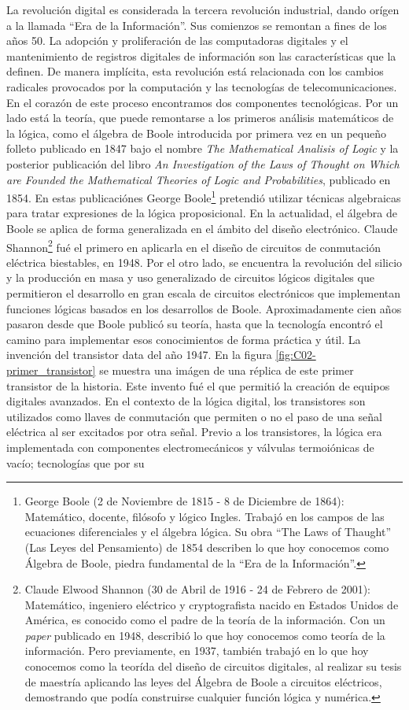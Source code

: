 La revolución digital es considerada la tercera revolución industrial, dando orígen a la llamada ``Era de la Información''. Sus comienzos se remontan a fines de los años 50. La adopción y proliferación de las computadoras digitales y el mantenimiento de registros digitales de información son las características que la definen. De manera implícita, esta revolución está relacionada con los cambios radicales provocados por la computación y las tecnologías de telecomunicaciones. En el corazón de este proceso encontramos dos componentes tecnológicas. Por un lado está la teoría, que puede remontarse a los primeros análisis matemáticos de la lógica, como el álgebra de Boole introducida por primera vez en un pequeño folleto publicado en 1847 bajo el nombre \emph{The Mathematical Analisis of Logic} y la posterior publicación del libro \emph{An Investigation of the Laws of Thought on Which are Founded the Mathematical Theories of Logic and Probabilities}, publicado en 1854. En estas publicaciónes George Boole\footnote{George Boole (2 de Noviembre de 1815 - 8 de Diciembre de 1864): Matemático, docente, filósofo y lógico Ingles. Trabajó en los campos de las ecuaciones diferenciales y el álgebra lógica. Su obra ``The Laws of Thaught'' (Las Leyes del Pensamiento) de 1854 describen lo que hoy conocemos como Álgebra de Boole, piedra fundamental de la ``Era de la Información''.} pretendió utilizar técnicas algebraicas para tratar expresiones de la lógica proposicional. En la actualidad, el álgebra de Boole se aplica de forma generalizada en el ámbito del diseño electrónico. Claude Shannon\footnote{Claude Elwood Shannon (30 de Abril de 1916 - 24 de Febrero de 2001): Matemático, ingeniero eléctrico y cryptografista nacido en Estados Unidos de América, es conocido como el padre de la teoría de la información. Con un \emph{paper} publicado en 1948, describió lo que hoy conocemos como teoría de la información. Pero previamente, en 1937, también trabajó en lo que hoy conocemos como la teorída del diseño de circuitos digitales, al realizar su tesis de maestría aplicando las leyes del Álgebra de Boole a circuitos eléctricos, demostrando que podía construirse cualquier función lógica y numérica.} fué el primero en aplicarla en el diseño de circuitos de conmutación eléctrica biestables, en 1948. Por el otro lado, se encuentra la revolución del silicio y la producción en masa y uso generalizado de circuitos lógicos digitales que permitieron el desarrollo en gran escala de circuitos electrónicos que implementan funciones lógicas basados en los desarrollos de Boole. Aproximadamente cien años pasaron desde que Boole publicó su teoría, hasta que la tecnología encontró el camino para implementar esos conocimientos de forma práctica y útil. La invención del transistor data del año 1947. En la figura \ref{fig:C02-primer_transistor} se muestra una imágen de una réplica de este primer transistor de la historia. Este invento fué el que permitió la creación de equipos digitales avanzados. En el contexto de la lógica digital, los transistores son utilizados como llaves de conmutación que permiten o no el paso de una señal eléctrica al ser excitados por otra señal. Previo a los transistores, la lógica era implementada con componentes electromecánicos y válvulas termoiónicas de vacío; tecnologías que por su 